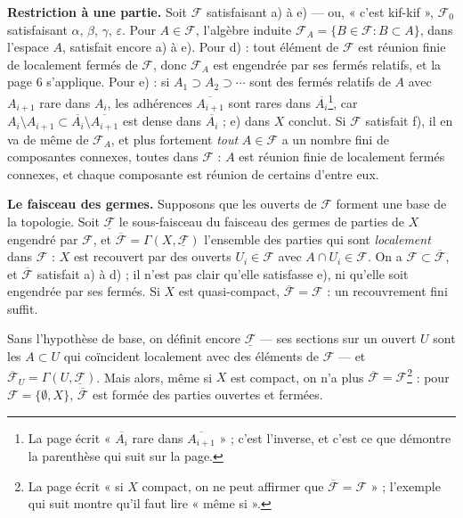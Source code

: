 \documentclass[11pt,a4paper]{article}
\begin{document}
\textbf{Restriction à une partie.} Soit $\mathcal{F}$ satisfaisant a) à e) — ou,
« c'est kif-kif », $\mathcal{F}_0$ satisfaisant $\alpha$, $\beta$, $\gamma$,
$\varepsilon$. Pour $A \in \mathcal{F}$, l'algèbre induite
$\mathcal{F}_A = \{ B \in \mathcal{F} : B \subset A \}$, dans l'espace $A$,
satisfait encore a) à e). Pour d) : tout élément de $\mathcal{F}$ est réunion
finie de localement fermés de $\mathcal{F}$, donc $\mathcal{F}_A$ est engendrée
par ses fermés relatifs, et la page 6 s'applique. Pour e) : si $A_1 \supset A_2
\supset \cdots$ sont des fermés relatifs de $A$ avec $A_{i+1}$ rare dans $A_i$,
les adhérences $\overline{A_{i+1}}$ sont rares dans
$\overline{A_i}$\footnote{La page écrit « $\overline{A_i}$ rare dans
$\overline{A_{i+1}}$ » ; c'est l'inverse, et c'est ce que démontre la
parenthèse qui suit sur la page.}, car $A_i \setminus A_{i+1} \subset
\overline{A_i} \setminus \overline{A_{i+1}}$ est dense dans $\overline{A_i}$ ;
e) dans $X$ conclut. Si $\mathcal{F}$ satisfait f), il en va de même de
$\mathcal{F}_A$, et plus fortement \emph{tout} $A \in \mathcal{F}$ a un nombre
fini de composantes connexes, toutes dans $\mathcal{F}$ : $A$ est réunion finie
de localement fermés connexes, et chaque composante est réunion de certains
d'entre eux.

\textbf{Le faisceau des germes.} Supposons que les ouverts de $\mathcal{F}$
forment une base de la topologie. Soit $\underline{\mathcal{F}}$ le
sous-faisceau du faisceau des germes de parties de $X$ engendré par
$\mathcal{F}$, et $\overline{\mathcal{F}} = \Gamma(X, \underline{\mathcal{F}})$
l'ensemble des parties qui sont \emph{localement} dans $\mathcal{F}$ : $X$ est
recouvert par des ouverts $U_i \in \mathcal{F}$ avec $A \cap U_i \in
\mathcal{F}$. On a $\mathcal{F} \subset \overline{\mathcal{F}}$, et
$\overline{\mathcal{F}}$ satisfait a) à d) ; il n'est pas clair qu'elle
satisfasse e), ni qu'elle soit engendrée par ses fermés. Si $X$ est
quasi-compact, $\overline{\mathcal{F}} = \mathcal{F}$ : un recouvrement fini
suffit.

Sans l'hypothèse de base, on définit encore $\underline{\mathcal{F}}$ — ses
sections sur un ouvert $U$ sont les $A \subset U$ qui coïncident localement avec
des éléments de $\mathcal{F}$ — et $\overline{\mathcal{F}}_U = \Gamma(U,
\underline{\mathcal{F}})$. Mais alors, même si $X$ est compact, on n'a plus
$\overline{\mathcal{F}} = \mathcal{F}$\footnote{La page écrit « si $X$
compact, on ne peut affirmer que $\overline{\mathcal{F}} = \mathcal{F}$ » ;
l'exemple qui suit montre qu'il faut lire « même si ».} : pour
$\mathcal{F} = \{\emptyset, X\}$, $\overline{\mathcal{F}}$ est formée des
parties ouvertes et fermées.
\end{document}
